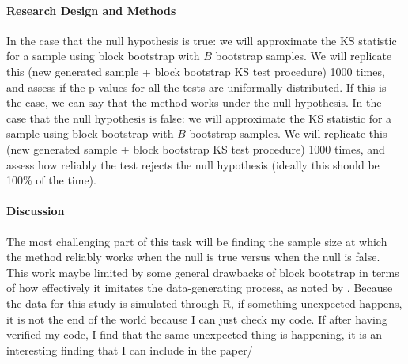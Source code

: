 \documentclass[12pt]{article}
\begin{document}
\paragraph{Research Design and Methods}
In the case that the null hypothesis is true:
we will approximate the KS statistic for a sample using 
block bootstrap with $B$ bootstrap samples. We will replicate this (new 
generated sample + block bootstrap KS test procedure) 1000 times, and assess 
if the p-values for all the tests are uniformally distributed. If this is the 
case, we can say
that the method works under the null hypothesis.
In the case that the null hypothesis is false:
we will approximate the KS statistic for a sample using 
block bootstrap with $B$ bootstrap samples. We will replicate this (new 
generated sample + block bootstrap KS test procedure) 1000 times, and assess
how reliably the test rejects the null hypothesis (ideally this should be 
100\% of the time).




\paragraph{Discussion}
The most challenging part of this task will be finding the sample size at which
the method reliably works when the null is true versus when the null is false.
This work maybe limited by some general drawbacks of block 
bootstrap in terms of how effectively it imitates the data-generating 
process, as noted by \citet{buhlmann2002bootstraps}. Because the data for this
study is simulated through R, if something unexpected happens, it is not the end
of the world because I can just check my code. If after having verified my 
code, I find that the same unexpected thing is happening, it is an interesting 
finding that I can include in the paper/







\end{document}
